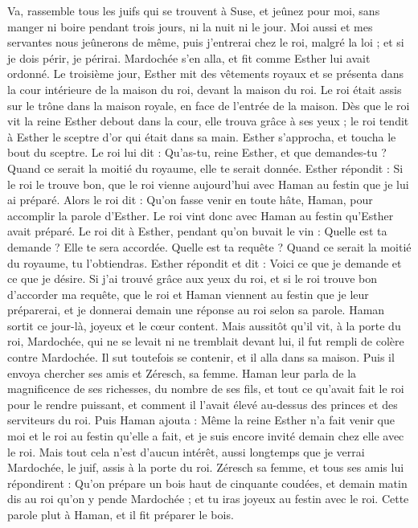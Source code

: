 \begin{multicols}{2}
Va, rassemble tous les juifs qui se trouvent à Suse, et jeûnez pour moi, sans manger ni boire pendant trois jours, ni la nuit ni le jour. Moi aussi et mes servantes nous jeûnerons de même, puis j'entrerai chez le roi, malgré la loi ; et si je dois périr, je périrai.
Mardochée s'en alla, et fit comme Esther lui avait ordonné.
\VerseOne{}Le troisième jour, Esther mit des vêtements royaux et se présenta dans la cour intérieure de la maison du roi, devant la maison du roi. Le roi était assis sur le trône dans la maison royale, en face de l’entrée de la maison.
Dès que le roi vit la reine Esther debout dans la cour, elle trouva grâce à ses yeux ; le roi tendit à Esther le sceptre d'or qui était dans sa main. Esther s'approcha, et toucha le bout du sceptre.
Le roi lui dit : Qu'as-tu, reine Esther, et que demandes-tu ? Quand ce serait la moitié du royaume, elle te serait donnée.
Esther répondit : Si le roi le trouve bon, que le roi vienne aujourd'hui avec Haman au festin que je lui ai préparé.
Alors le roi dit : Qu'on fasse venir en toute hâte, Haman, pour accomplir la parole d'Esther. Le roi vint donc avec Haman au festin qu'Esther avait préparé.
Le roi dit à Esther, pendant qu’on buvait le vin : Quelle est ta demande ? Elle te sera accordée. Quelle est ta requête ? Quand ce serait la moitié du royaume, tu l’obtiendras.
Esther répondit et dit : Voici ce que je demande et ce que je désire.
Si j'ai trouvé grâce aux yeux du roi, et si le roi trouve bon d'accorder ma requête, que le roi et Haman viennent au festin que je leur préparerai, et je donnerai demain une réponse au roi selon sa parole.
Haman sortit ce jour-là, joyeux et le cœur content. Mais aussitôt qu'il vit, à la porte du roi, Mardochée, qui ne se levait ni ne tremblait devant lui, il fut rempli de colère contre Mardochée.
Il sut toutefois se contenir, et il alla dans sa maison. Puis il envoya chercher ses amis et Zéresch, sa femme.
Haman leur parla de la magnificence de ses richesses, du nombre de ses fils, et tout ce qu’avait fait le roi pour le rendre puissant, et comment il l'avait élevé au-dessus des princes et des serviteurs du roi.
Puis Haman ajouta : Même la reine Esther n'a fait venir que moi et le roi au festin qu'elle a fait, et je suis encore invité demain chez elle avec le roi.
Mais tout cela n’est d’aucun intérêt, aussi longtemps que je verrai Mardochée, le juif, assis à la porte du roi.
Zéresch sa femme, et tous ses amis lui répondirent : Qu'on prépare un bois haut de cinquante coudées, et demain matin dis au roi qu'on y pende Mardochée ; et tu iras joyeux au festin avec le roi. Cette parole plut à Haman, et il fit préparer le bois.

\end{multicols}
